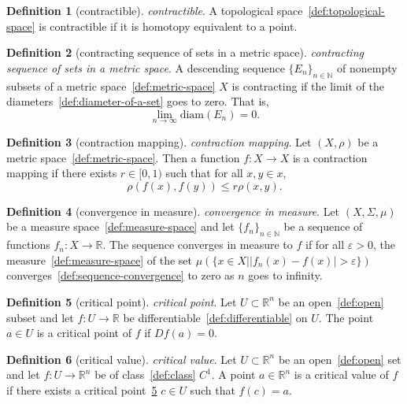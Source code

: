 \documentclass[12pt,a4paper]{article}
\theoremstyle{definition}
\newtheorem{definition}{Definition}
\begin{document}
\begin{definition}[contractible]\label{def:contractible}
\emph{contractible}. A topological space~\ref{def:topological-space} is contractible if it is homotopy equivalent to a point.
\end{definition}

\begin{definition}[contracting sequence of sets in a metric space]\label{def:contracting-sequence-of-sets-in-a-metric-space}
\emph{contracting sequence of sets in a metric space}. A descending sequence $\{E_n\}_{n\in\mathbb N}$ of nonempty subsets of a metric space~\ref{def:metric-space} $X$ is contracting if the limit of the diameters~\ref{def:diameter-of-a-set} goes to zero. That is, $$\lim_{n\to \infty} \text{diam}(E_n) = 0.$$
\end{definition}

\begin{definition}[contraction mapping]\label{def:contraction-mapping}
\emph{contraction mapping}. Let $(X,\rho)$ be a metric space~\ref{def:metric-space}. Then a function $f:X\to X$ is a contraction mapping if there exists $r \in [0,1)$ such that for all $x,y \in x$, $$\rho(f(x),f(y)) \leq r\rho(x,y).$$
\end{definition}

\begin{definition}[convergence in measure]\label{def:convergence-in-measure}
\emph{convergence in measure}. Let $(X,\Sigma,\mu)$ be a measure space~\ref{def:measure-space} and let $\{f_n\}_{n\in\mathbb N}$ be a sequence of functions $f_n: X\to \mathbb R$. The sequence converges in measure to $f$ if for all $\varepsilon > 0$, the measure~\ref{def:measure-space} of the set $\mu(\{x\in X\mid \vert f_n(x) -f(x)\vert >\varepsilon\})$ converges~\ref{def:sequence-convergence} to zero as $n$ goes to infinity.
\end{definition}

\begin{definition}[critical point]\label{def:critical-point}
\emph{critical point}. Let $U\subset\mathbb R^n$ be an open~\ref{def:open} subset and let $f:U\to\mathbb R$ be differentiable~\ref{def:differentiable} on $U$. The point $a \in U$ is a critical point of $f$  if $Df(a) =0$.
\end{definition}

\begin{definition}[critical value]\label{def:critical-value}
\emph{critical value}. Let $U\subset\mathbb R^n$ be an open~\ref{def:open} set and let $f:U\to\mathbb R^n$ be of class~\ref{def:class} $C^1$. A point $a\in \mathbb R^n$ is a critical value of $f$ if there exists a critical point~\ref{def:critical-point} $c \in U$ such that $f(c) =a$.
\end{definition}
\end{document}

